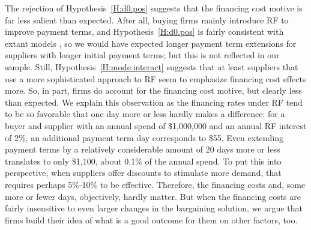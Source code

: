 \documentclass[a4paper,11pt]{article}
\renewcommand{\~}[1]{\tilde{#1}}
\renewcommand{\-}[1]{\overline{#1}}
\begin{document}
The rejection of Hypothesis~\ref{H:d0.pos} suggests that the financing cost motive is far less salient than expected. After all, buying firms mainly introduce RF to improve payment terms, and Hypothesis~\ref{H:d0.pos} is fairly consistent with extant models \citep[e.g.,][]{Lekkakos2016, Kouvelis2020,vanderVliet2015, Wuttke2016}, so we would have expected longer payment term extensions for suppliers with longer initial payment terms; but this is not reflected in our sample. Still, Hypothesis~\ref{H:mode:interact} suggests that at least suppliers that use a more sophisticated approach to RF seem to emphasize financing cost effects more. So, in part, firms do account for the financing cost motive, but clearly less than expected. We explain this observation as the financing rates under RF tend to be so favorable that one day more or less hardly makes a difference: for a buyer and supplier with an annual spend of \$1,000,000 and an annual RF interest of 2\%, an additional payment term day corresponds to \$55. Even extending payment terms by a relatively considerable amount of 20 days more or less translates to only \$1,100, about 0.1\% of the annual spend. To put this into perspective, when suppliers offer discounts to stimulate more demand, that requires perhaps 5\%-10\% to be effective. Therefore, the financing costs and, some more or fewer days, objectively, hardly matter. But when the financing costs are fairly insensitive to even larger changes in the bargaining solution, we argue that firms build their idea of what is a good outcome for them on other factors, too.
\end{document}
